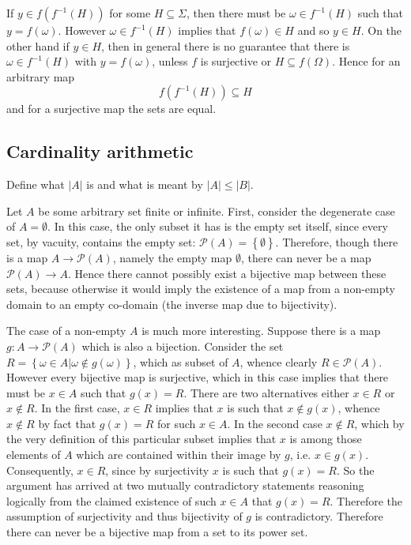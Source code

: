 \documentclass[a4paper]{article}
\newcommand{\obj}[1]{\left\{{#1}\right\}}
\newcommand{\brac}[1]{{\left({#1}\right)}}
\begin{document}
If $y\in f(f^{-1}(H))$ for some $H\subseteq \Sigma$, then there must be $\omega\in f^{-1}(H)$ such that $y=f(\omega)$. However $\omega\in f^{-1}(H)$ implies that $f(\omega)\in H$ and so $y\in H$. On the other hand if $y\in H$, then in general there is no guarantee that there is $\omega\in f^{-1}(H)$ with $y=f(\omega)$, unless $f$ is surjective or $H\subseteq f(\Omega)$. Hence for an arbitrary map \[f(f^{-1}(H))\subseteq H\] and for a surjective map the sets are equal.




\subsection{Cardinality arithmetic} %
\label{sub:cardinality_arithmetic}

Define what $|A|$ is and what is meant by $|A|\leq |B|$.

Let $A$ be some arbitrary set finite or infinite. First, consider the degenerate case of $A=\emptyset$. In this case, the only subset it has is the empty set itself, since every set, by vacuity, contains the empty set: $\mathcal{P}\brac{A}=\obj{\emptyset}$. Therefore, though there is a map $A\to \mathcal{P}\brac{A}$, namely the empty map $\emptyset$, there can never be a map $\mathcal{P}\brac{A}\to A$. Hence there cannot possibly exist a bijective map between these sets, because otherwise it would imply the existence of a map from a non-empty domain to an empty co-domain (the inverse map due to bijectivity).

The case of a non-empty $A$ is much more interesting. Suppose there is a map $g:A\to \mathcal{P}\brac{A}$ which is also a bijection. Consider the set $R=\obj{\omega\in A\vert \omega\notin g(\omega)}$, which as subset of $A$, whence clearly $R\in \mathcal{P}\brac{A}$. However every bijective map is surjective, which in this case implies that there must be $x\in A$ such that $g(x)=R$. There are two alternatives either $x\in R$ or $x\notin R$.
In the first case, $x\in R$ implies that $x$ is such that $x\notin g(x)$, whence $x\notin R$ by fact that $g(x)=R$ for such $x\in A$.
In the second case $x\notin R$, which by the very definition of this particular subset implies that $x$ is among those elements of $A$ which are contained within their image by $g$, i.e. $x\in g(x)$. Consequently, $x\in R$, since by surjectivity $x$ is such that $g(x)=R$.
So the argument has arrived at two mutually contradictory statements reasoning logically from the claimed existence of such $x\in A$ that $g(x)=R$. Therefore the assumption of surjectivity and thus bijectivity of $g$ is contradictory. Therefore there can never be a bijective map from a set to its power set.
\end{document}
